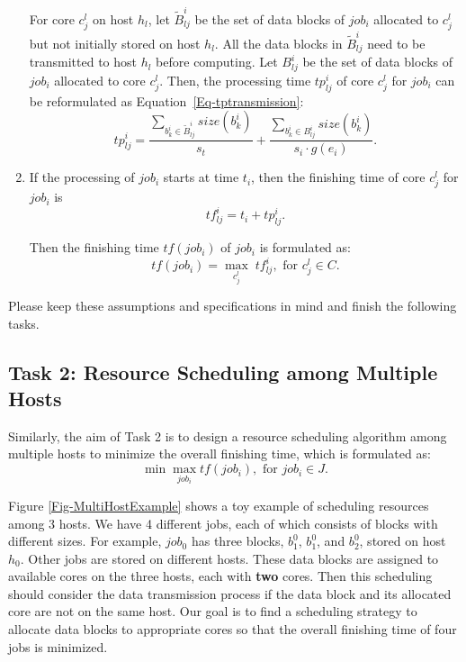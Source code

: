 \documentclass{llncs}
\begin{document}
\begin{enumerate}
  \qquad For core $c^l_j$ on host $h_l$, let $\widetilde{B}^i_{lj}$ be the set of data blocks of $job_i$ allocated to $c^l_j$ but not initially stored on host $h_l$. All the data blocks in $\widetilde{B}^i_{lj}$ need to be transmitted to host $h_l$ before computing. Let $B^i_{lj}$ be the set of data blocks of $job_i$ allocated to core $c^l_j$. Then, the processing time $tp^i_{lj}$ of core $c^l_j$ for $job_i$ can be reformulated as Equation~\eqref{Eq-tptransmission}:
  \begin{equation} \label{Eq-tptransmission}
  tp^i_{lj} = \frac{\sum_{b^i_{k} \in \widetilde{B}^i_{lj}} size(b^i_{k})}{s_t} + \frac{\sum_{b^i_{k} \in B^i_{lj}}size(b^i_{k})}{s_i \cdot g(e_i)}.
  \end{equation}

 \item If the processing of $job_i$ starts at time $t_i$, then the finishing time of core $c^l_j$ for $job_i$ is
  \begin{equation*}
  tf^i_{lj} = t_i + tp^i_{lj}.
  \end{equation*}

  Then the finishing time $tf(job_i)$ of $job_i$ is formulated as:
  \begin{equation*}
  tf(job_i) = \max_{c^l_j} \; tf^i_{lj}, \text{ for } c^l_j \in C.
  \end{equation*}

\end{enumerate}

Please keep these assumptions and specifications in mind and finish the following tasks.

\subsection{Task 2: Resource Scheduling among Multiple Hosts}

Similarly, the aim of Task 2 is to design a resource scheduling algorithm among multiple hosts to minimize the overall finishing time, which is formulated as:
  \begin{equation*}
  \min \max_{job_i} tf(job_i), \text{ for } job_i \in J.
  \end{equation*}

Figure \ref{Fig-MultiHostExample} shows a toy example of scheduling resources among 3 hosts. We have 4 different jobs, each of which consists of blocks with different sizes. For example, $job_0$ has three blocks, $b^0_1$, $b^0_1$, and $b^0_2$, stored on host $h_0$. Other jobs are stored on different hosts. These data blocks are assigned to available cores on the three hosts, each with \textbf{two} cores. Then this scheduling should consider the data transmission process if the data block and its allocated core are not on the same host. Our goal is to find a scheduling strategy to allocate data blocks to appropriate cores so that the overall finishing time of four jobs is minimized.
\end{document}
